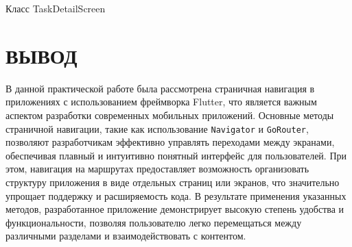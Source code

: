 \begin{image}
	\caption{Класс TaskDetailScreen}
	\label{fig:gorouter:detail}
\end{image}

\clearpage

\section*{ВЫВОД}

В данной практической работе была рассмотрена страничная навигация
в приложениях с использованием фреймворка Flutter,
что является важным аспектом разработки современных мобильных приложений.
Основные методы страничной навигации,
такие как использование \texttt{Navigator} и \texttt{GoRouter},
позволяют разработчикам эффективно управлять переходами между экранами,
обеспечивая плавный и интуитивно понятный интерфейс для пользователей.
При этом, навигация на маршрутах предоставляет возможность организовать
структуру приложения в виде отдельных страниц или экранов,
что значительно упрощает поддержку и расширяемость кода.
В результате применения указанных методов,
разработанное приложение демонстрирует высокую степень удобства
и функциональности, позволяя пользователю легко перемещаться
между различными разделами и взаимодействовать с контентом.

